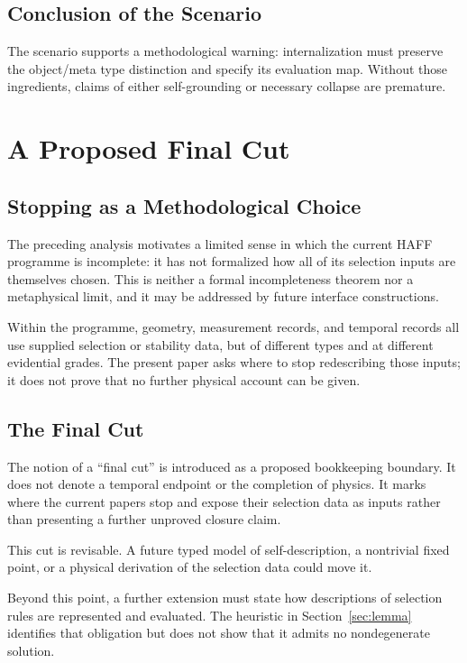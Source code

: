\documentclass[12pt,a4paper]{article}
\begin{document}
\subsection{Conclusion of the Scenario}

The scenario supports a methodological warning: internalization must preserve the object/meta type distinction and specify its evaluation map.  Without those ingredients, claims of either self-grounding or necessary collapse are premature.

\section{A Proposed Final Cut}
\label{sec:cut}

\subsection{Stopping as a Methodological Choice}

The preceding analysis motivates a limited sense in which the current HAFF programme is incomplete: it has not formalized how all of its selection inputs are themselves chosen.  This is neither a formal incompleteness theorem nor a metaphysical limit, and it may be addressed by future interface constructions.

Within the programme, geometry, measurement records, and temporal records all use supplied selection or stability data, but of different types and at different evidential grades.  The present paper asks where to stop redescribing those inputs; it does not prove that no further physical account can be given.

\subsection{The Final Cut}

The notion of a ``final cut'' is introduced as a proposed bookkeeping boundary. It does not denote a temporal endpoint or the completion of physics.  It marks where the current papers stop and expose their selection data as inputs rather than presenting a further unproved closure claim.

This cut is revisable.  A future typed model of self-description, a nontrivial fixed point, or a physical derivation of the selection data could move it.

Beyond this point, a further extension must state how descriptions of selection rules are represented and evaluated.  The heuristic in Section~\ref{sec:lemma} identifies that obligation but does not show that it admits no nondegenerate solution.
\end{document}
